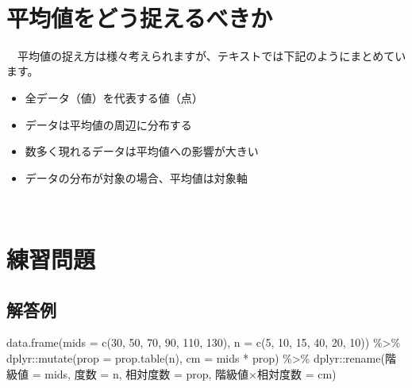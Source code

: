 \documentclass[
  12pt,
]{book}
\newenvironment{Shaded}{\begin{snugshade}}{\end{snugshade}}
\newcommand{\AttributeTok}[1]{\textcolor[rgb]{0.77,0.63,0.00}{#1}}
\newcommand{\DecValTok}[1]{\textcolor[rgb]{0.00,0.00,0.81}{#1}}
\newcommand{\FunctionTok}[1]{\textcolor[rgb]{0.00,0.00,0.00}{#1}}
\newcommand{\NormalTok}[1]{#1}
\newcommand{\OtherTok}[1]{\textcolor[rgb]{0.56,0.35,0.01}{#1}}
\newcommand{\SpecialCharTok}[1]{\textcolor[rgb]{0.00,0.00,0.00}{#1}}
\newcommand{\StringTok}[1]{\textcolor[rgb]{0.31,0.60,0.02}{#1}}
\providecommand{\tightlist}{%
  \setlength{\itemsep}{0pt}\setlength{\parskip}{0pt}}
\begin{document}
　

\hypertarget{ux5e73ux5747ux5024ux3092ux3069ux3046ux6349ux3048ux308bux3079ux304dux304b}{%
\section{平均値をどう捉えるべきか}\label{ux5e73ux5747ux5024ux3092ux3069ux3046ux6349ux3048ux308bux3079ux304dux304b}}

　平均値の捉え方は様々考えられますが、テキストでは下記のようにまとめています。

\begin{itemize}
\tightlist
\item
  全データ（値）を代表する値（点）
\item
  データは平均値の周辺に分布する
\item
  数多く現れるデータは平均値への影響が大きい
\item
  データの分布が対象の場合、平均値は対象軸
\end{itemize}

　

\hypertarget{ux7df4ux7fd2ux554fux984c-1}{%
\section{練習問題}\label{ux7df4ux7fd2ux554fux984c-1}}

\hypertarget{ux89e3ux7b54ux4f8b-1}{%
\subsection{解答例}\label{ux89e3ux7b54ux4f8b-1}}

\begin{Shaded}
\begin{Highlighting}[]
\FunctionTok{data.frame}\NormalTok{(}\AttributeTok{mids =} \FunctionTok{c}\NormalTok{(}\DecValTok{30}\NormalTok{, }\DecValTok{50}\NormalTok{, }\DecValTok{70}\NormalTok{, }\DecValTok{90}\NormalTok{, }\DecValTok{110}\NormalTok{, }\DecValTok{130}\NormalTok{), }\AttributeTok{n =} \FunctionTok{c}\NormalTok{(}\DecValTok{5}\NormalTok{, }\DecValTok{10}\NormalTok{, }\DecValTok{15}\NormalTok{, }\DecValTok{40}\NormalTok{, }\DecValTok{20}\NormalTok{, }\DecValTok{10}\NormalTok{)) }\SpecialCharTok{\%\textgreater{}\%} 
\NormalTok{  dplyr}\SpecialCharTok{::}\FunctionTok{mutate}\NormalTok{(}\AttributeTok{prop =} \FunctionTok{prop.table}\NormalTok{(n), }\AttributeTok{cm =}\NormalTok{ mids }\SpecialCharTok{*}\NormalTok{ prop) }\SpecialCharTok{\%\textgreater{}\%} 
\NormalTok{  dplyr}\SpecialCharTok{::}\FunctionTok{rename}\NormalTok{(}\StringTok{\textasciigrave{}}\AttributeTok{階級値}\StringTok{\textasciigrave{}} \OtherTok{=}\NormalTok{ mids, }\StringTok{\textasciigrave{}}\AttributeTok{度数}\StringTok{\textasciigrave{}} \OtherTok{=}\NormalTok{ n, }\StringTok{\textasciigrave{}}\AttributeTok{相対度数}\StringTok{\textasciigrave{}} \OtherTok{=}\NormalTok{ prop, }\StringTok{\textasciigrave{}}\AttributeTok{階級値×相対度数}\StringTok{\textasciigrave{}} \OtherTok{=}\NormalTok{ cm)}
\end{Highlighting}
\end{Shaded}
\end{document}

